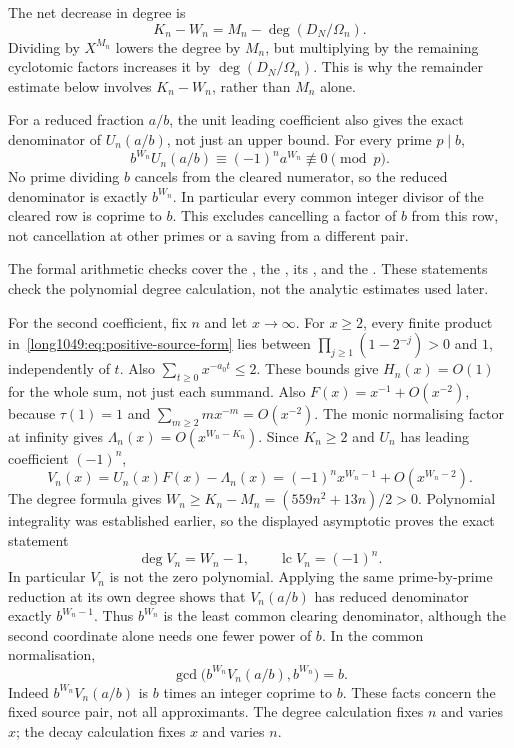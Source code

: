 The net decrease in degree is
\[
 K_n-W_n=M_n-\deg(D_N/\Omega_n).
\]
Dividing by $X^{M_n}$ lowers the degree by $M_n$, but multiplying
by the remaining cyclotomic factors increases it by
$\deg(D_N/\Omega_n)$. This is why the remainder estimate below
involves $K_n-W_n$, rather than $M_n$ alone.

For a reduced fraction $a/b$, the unit leading coefficient also gives
the exact denominator of $U_n(a/b)$, not just an upper bound. For every prime $p\mid b$,
\[
 b^{W_n}U_n(a/b)\equiv(-1)^n a^{W_n}\not\equiv0\pmod p.
\]
No prime dividing $b$ cancels from the cleared numerator, so the
reduced denominator is exactly $b^{W_n}$. In particular every common
integer divisor of the cleared row is coprime to $b$. This excludes
cancelling a factor of $b$ from this row, not cancellation at other
primes or a saving from a different pair.

The formal arithmetic checks cover the
,
the
,
its
,
and the
.
These statements check the polynomial degree calculation, not the
analytic estimates used later.

For the second coefficient, fix $n$ and let $x\to\infty$. For $x\ge2$,
every finite product in~\eqref{long1049:eq:positive-source-form} lies
between $\prod_{j\ge1}(1-2^{-j})>0$ and $1$, independently of $t$.
Also $\sum_{t\ge0}x^{-a_0t}\le2$. These bounds give $H_n(x)=O(1)$
for the whole sum, not just each summand. Also
$F(x)=x^{-1}+O(x^{-2})$, because $\tau(1)=1$ and
$\sum_{m\ge2}m x^{-m}=O(x^{-2})$. The monic normalising factor at
infinity gives $\Lambda_n(x)=O(x^{W_n-K_n})$. Since $K_n\ge2$ and
$U_n$ has leading coefficient $(-1)^n$,
\[
 V_n(x)=U_n(x)F(x)-\Lambda_n(x)
       =(-1)^n x^{W_n-1}+O(x^{W_n-2}).
\]
The degree formula gives $W_n\ge K_n-M_n=(559n^2+13n)/2>0$.
Polynomial integrality was established earlier, so the displayed
asymptotic proves the exact statement
\begin{equation}\label{long1049:eq:V-degree}
 \deg V_n=W_n-1,\qquad \operatorname{lc}V_n=(-1)^n.
\end{equation}
In particular $V_n$ is not the zero polynomial. Applying the same
prime-by-prime reduction at its own degree shows that $V_n(a/b)$ has
reduced denominator exactly $b^{W_n-1}$. Thus $b^{W_n}$ is the least
common clearing denominator, although the second coordinate alone
needs one fewer power of $b$. In the common normalisation,
\[
 \gcd\!\bigl(b^{W_n}V_n(a/b),b^{W_n}\bigr)=b.
\]
Indeed $b^{W_n}V_n(a/b)$ is $b$ times an integer coprime to $b$.
These facts concern the fixed source pair, not all approximants.
The degree calculation fixes $n$ and varies $x$; the decay calculation
fixes $x$ and varies $n$.


